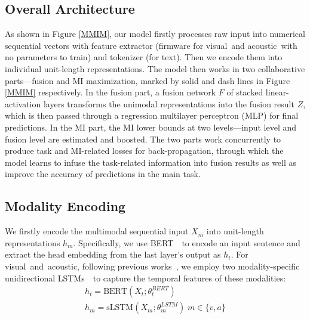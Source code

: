 \documentclass[11pt]{article}
\newcommand{\mv}{visual}
\newcommand{\ma}{acoustic}
\begin{document}
\subsection{Overall Architecture}
As shown in Figure \ref{MMIM}, our model firstly processes raw input into numerical sequential vectors with feature extractor (firmware for \mv\ and \ma\ with no parameters to train) and tokenizer (for text). 
Then we encode them into individual unit-length representations. 
The model then works in two collaborative parts---fusion and MI maximization, marked by solid and dash lines in Figure \ref{MMIM} respectively.
In the fusion part, a fusion network $F$ of stacked linear-activation layers transforms the unimodal representations into the fusion result $Z$, which is then passed through a regression multilayer perceptron (MLP) for final predictions. 
In the MI part, the MI lower bounds at two levels---input level and fusion level are estimated and boosted.
The two parts work concurrently to produce task and MI-related losses for back-propagation, through which the model learns to infuse the task-related information into fusion results as well as improve the accuracy
of predictions in the main task.


\subsection{Modality Encoding}
We firstly encode the multimodal sequential input $X_m$ into unit-length representations $h_m$. 
Specifically, we use BERT~\citep{devlin2019bert}~to encode an input sentence and extract the head embedding from the last layer's output as $h_t$. 
For \mv~and~\ma, following previous works~\citep{hazarika2020misa, yu2021learning}, we employ two modality-specific unidirectional LSTMs~\citep{hochreiter1997long}~to capture the temporal features of these modalities:
\begin{equation}
\begin{gathered}
    h_t = \textrm{BERT}\left(X_t;\theta_t^{BERT}\right) \\
    h_m = \textrm{sLSTM}\left(X_m; \theta_m^{LSTM}\right) \; m\in\{v,a\}
\end{gathered}
\label{encoding}
\end{equation}
\end{document}

